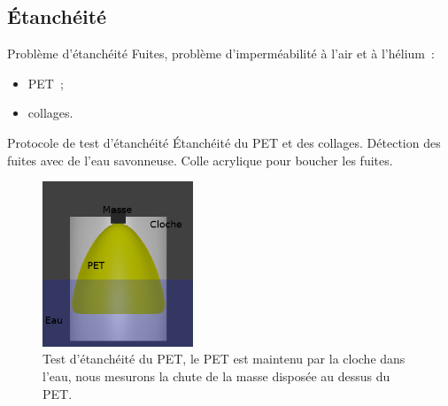 \subsection{Étanchéité}

\begin{frame}{Problème d'étanchéité}
	Fuites, problème d'imperméabilité à l'air et à l'hélium~:
	\begin{itemize}
	 \item PET~;
	 \item collages.
	\end{itemize}
\end{frame}

\begin{frame}{Protocole de test d'étanchéité}
 Étanchéité du PET et des collages. Détection des fuites avec de l'eau savonneuse. Colle acrylique pour boucher les fuites.

\begin{figure}[H]
	\centering
	\includegraphics[width=4.5cm]{../Images/etancheite.png}
	\caption{Test d'étanchéité du PET, le PET est maintenu par la cloche dans l'eau, nous mesurons la chute de la masse disposée au dessus du PET.}
\end{figure}

\end{frame}

